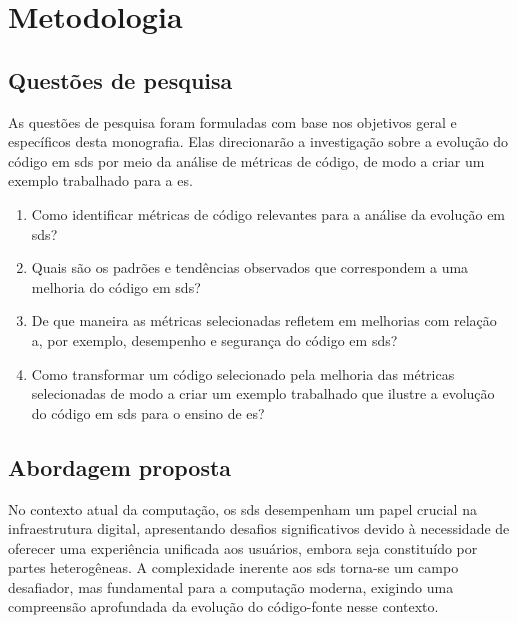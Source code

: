
\chapter{Metodologia}\label{cap:Metodologia}

\section{Questões de pesquisa}
As questões de pesquisa foram formuladas com base nos objetivos geral e específicos desta monografia. Elas direcionarão a investigação sobre a evolução do código em \gls{sds} por meio da análise de métricas de código, de modo a criar um exemplo trabalhado para a \gls{es}.

\begin{enumerate}
    \item Como identificar métricas de código relevantes para a análise da evolução em \gls{sds}?
    
    \item Quais são os padrões e tendências observados que correspondem a uma melhoria do código em \gls{sds}?
    
    \item De que maneira as métricas selecionadas refletem em melhorias com relação a, por exemplo, desempenho e segurança do código em \gls{sds}?
    
    \item Como transformar um código selecionado pela melhoria das métricas selecionadas de modo a criar um exemplo trabalhado que ilustre a evolução do código em \gls{sds} para o ensino de \gls{es}?
\end{enumerate}

\section{Abordagem proposta}

No contexto atual da computação, os \gls{sds} desempenham um papel crucial na infraestrutura digital, apresentando desafios significativos devido à necessidade de oferecer uma experiência unificada aos usuários, embora seja constituído por partes heterogêneas. A complexidade inerente aos \gls{sds} torna-se um campo desafiador, mas fundamental para a computação moderna, exigindo uma compreensão aprofundada da evolução do código-fonte nesse contexto.

